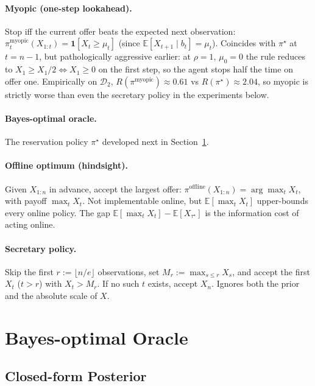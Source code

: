 \documentclass[11pt]{article}
\begin{document}
\paragraph{Myopic (one-step lookahead).} Stop iff the current offer beats the expected next observation: $\pi_t^{\mathrm{myopic}}(X_{1:t}) = \mathbf{1}[X_t \ge \mu_t]$ (since $\mathbb{E}[X_{t+1} \mid b_t] = \mu_t$). Coincides with $\pi^\star$ at $t = n-1$, but pathologically aggressive earlier: at $\rho = 1$, $\mu_0 = 0$ the rule reduces to $X_1 \ge X_1/2 \iff X_1 \ge 0$ on the first step, so the agent stops half the time on offer one. Empirically on $\mathcal{D}_2$, $R(\pi^{\mathrm{myopic}}) \approx 0.61$ vs $R(\pi^\star) \approx 2.04$, so myopic is strictly worse than even the secretary policy in the experiments below.

\paragraph{Bayes-optimal oracle.} The reservation policy $\pi^\star$ developed next in Section~\ref{sec:oracle}.

\paragraph{Offline optimum (hindsight).} Given $X_{1:n}$ in advance, accept the largest offer: $\pi^{\mathrm{offline}}(X_{1:n}) = \arg\max_t X_t$, with payoff $\max_t X_t$. Not implementable online, but $\mathbb{E}[\max_t X_t]$ upper-bounds every online policy. The gap $\mathbb{E}[\max_t X_t] - \mathbb{E}[X_{\tau^\star}]$ is the information cost of acting online.

\paragraph{Secretary policy.} Skip the first $r := \lfloor n/e \rfloor$ observations, set $M_r := \max_{s\le r} X_s$, and accept the first $X_t$ ($t > r$) with $X_t > M_r$. If no such $t$ exists, accept $X_n$. Ignores both the prior and the absolute scale of $X$.

\section{Bayes-optimal Oracle}
\label{sec:oracle}

\subsection{Closed-form Posterior}
\end{document}
